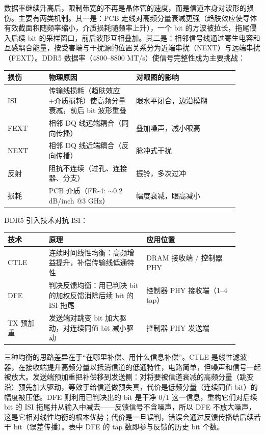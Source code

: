 

数据率继续升高后，限制带宽的不再是晶体管的速度，而是信道本身对波形的损伤。主要有两类机制。其一是：PCB 走线对高频分量衰减更强（趋肤效应使导体有效截面积随频率缩小，介质损耗随频率上升），一个 bit 的方波被拉长，拖尾侵入后续 bit 的采样窗口，前后波形互相叠加。其二是：相邻信号线通过寄生电容和互感耦合能量，按受害端与干扰源的位置关系分为近端串扰（NEXT）与远端串扰（FEXT）。DDR5 数据率（4800--8800 MT/s）使信号完整性成为主要挑战：

\begin{longtable}{L{0.16\linewidth}L{0.34\linewidth}L{0.4\linewidth}}
\toprule
损伤 & 物理原因 & 对眼图的影响 \\
\midrule
ISI & 传输线损耗（趋肤效应+介质损耗）使高频分量衰减，前后 bit 波形重叠 & 眼水平闭合，边沿模糊 \\\tablerowrule
FEXT & 相邻 DQ 线远端耦合（同向传播） & 叠加噪声，减小眼高 \\\tablerowrule
NEXT & 相邻 DQ 线近端耦合（反向传播） & 脉冲式干扰 \\\tablerowrule
反射 & 阻抗不连续（过孔、连接器、分支） & 振铃，多次过冲 \\\tablerowrule
损耗 & PCB 介质（FR-4: $\sim$0.2 dB/inch @3 GHz） & 幅度衰减，眼高减小 \\
\bottomrule
\end{longtable}

DDR5 引入技术对抗 ISI：

\begin{longtable}{L{0.16\linewidth}L{0.38\linewidth}L{0.36\linewidth}}
\toprule
技术 & 原理 & 应用位置 \\
\midrule
CTLE & 连续时间线性均衡：高频增益提升，补偿传输线低通特性 & DRAM 接收端 / 控制器 PHY \\\tablerowrule
DFE & 判决反馈均衡：用已判决 bit 的加权反馈消除后续 bit 的 ISI 拖尾 & 控制器 PHY 接收端（1--4 tap） \\\tablerowrule
TX 预加重 & 发送端对跳变 bit 加大驱动，对连续同值 bit 减小驱动 & 控制器 PHY 发送端 \\
\bottomrule
\end{longtable}

\begin{classicnote}
三种均衡的思路差异在于“在哪里补偿、用什么信息补偿”。CTLE 是线性滤波器，在接收端提升高频分量以抵消信道的低通特性，电路简单，但噪声和信号一起被放大。发送端预加重把补偿移到发送侧：对将要被信道衰减的高频分量（跳变沿）预先加大驱动，等效于给信道做预失真，代价是低频分量（连续同值 bit）的幅度被压低。DFE 则利用已判决出的 bit 是干净 0/1 这一信息，重构它们对后续 bit 的 ISI 拖尾并从输入中减去——反馈信号不含噪声，所以 DFE 不放大噪声，这是它相对线性均衡的根本优势；代价是一旦误判，错误会通过反馈传播给后续若干 bit（误差传播）。表中 DFE 的 tap 数即参与反馈的历史 bit 个数。
\end{classicnote}

